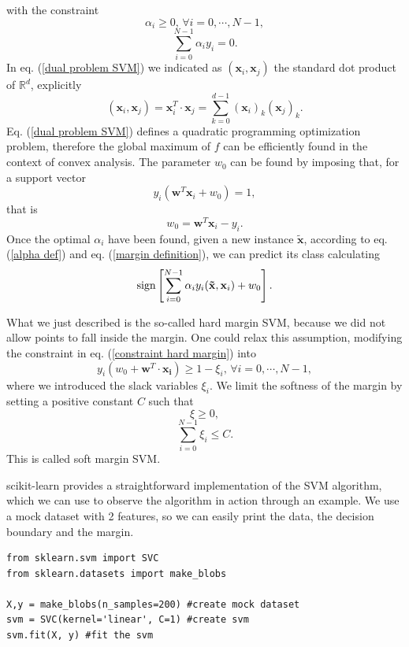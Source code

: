 \documentclass[a4paper]{article}
\begin{document}
with the constraint
\begin{equation}
    \alpha_i\geq 0,\,\forall i=0,\cdots, N-1,
\end{equation}
\begin{equation}
    \sum_{i=0}^{N-1}\alpha_iy_i=0.
\end{equation}
In eq. (\ref{dual problem SVM}) we indicated as $(\mathbf{x}_i,\mathbf{x}_j)$ the standard dot product of $\mathbb{R}^d$, explicitly
$$(\mathbf{x}_i,\mathbf{x}_j)=\mathbf{x}_i^T\cdot\mathbf{x}_j=\sum_{k=0}^{d-1}(\mathbf{x}_i)_k(\mathbf{x}_j)_k.$$
Eq. (\ref{dual problem SVM}) defines a quadratic programming
optimization problem, therefore the global maximum of $f$ can be efficiently found in the context of convex analysis. The parameter $w_0$ can be found by imposing that, for a support vector $$y_i(\mathbf{w}^T\mathbf{x}_i+w_0)=1,$$ that is 
\begin{equation}
    w_0=\mathbf{w}^T\mathbf{x}_i-y_i.
\end{equation} 
Once the optimal $\alpha_i$ have been found, given a new instance $\mathbf{\tilde{x}}$, according to eq. (\ref{alpha def}) and eq. (\ref{margin definition}), we can predict its class calculating 
\begin{equation}
    \textup{sign}\left[\sum_{i=0}^{N-1}\alpha_iy_i(\mathbf{\tilde{x}}, \mathbf{x}_i)+w_0\right].
    \label{decision boundary svm}
\end{equation} 

What we just described is the so-called hard margin SVM, because we did not allow points to fall inside the margin. One could relax this assumption, modifying the constraint in eq. (\ref{constraint hard margin}) into 
\begin{equation}
    y_i(w_0+\mathbf{w}^T\cdot \mathbf{x_i})\geq 1-\xi_i, \, \forall i=0,\cdots, N-1,
\end{equation}
where we introduced the slack variables $\xi_i$. We limit the softness of the margin by setting a positive constant $C$ such that 
$$ \xi\geq0,$$
\begin{equation}
    \sum_{i=0}^{N-1}\xi_i\leq C.
\end{equation}
This is called soft margin SVM. 

scikit-learn provides a straightforward implementation of the SVM algorithm, which we can use to observe the algorithm in action through an example. We use a mock dataset with 2 features, so we can easily print the data, the decision boundary and the margin. 


\begin{lstlisting}
from sklearn.svm import SVC
from sklearn.datasets import make_blobs 

X,y = make_blobs(n_samples=200) #create mock dataset
svm = SVC(kernel='linear', C=1) #create svm
svm.fit(X, y) #fit the svm
\end{lstlisting}
\end{document}
